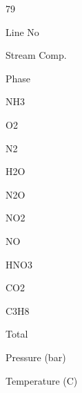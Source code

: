 \documentclass[a4paper,portrait,12pt]{article}
\begin{document}
79





\begin{flushleft}
\newpage
Line No
\end{flushleft}


\begin{flushleft}
Stream Comp.
\end{flushleft}


\begin{flushleft}
Phase
\end{flushleft}


\begin{flushleft}
NH3
\end{flushleft}


\begin{flushleft}
O2
\end{flushleft}


\begin{flushleft}
N2
\end{flushleft}


\begin{flushleft}
H2O
\end{flushleft}


\begin{flushleft}
N2O
\end{flushleft}


\begin{flushleft}
NO2
\end{flushleft}


\begin{flushleft}
NO
\end{flushleft}


\begin{flushleft}
HNO3
\end{flushleft}


\begin{flushleft}
CO2
\end{flushleft}


\begin{flushleft}
C3H8
\end{flushleft}


\begin{flushleft}
Total
\end{flushleft}


\begin{flushleft}
Pressure (bar)
\end{flushleft}


\begin{flushleft}
Temperature (C)
\end{flushleft}
\end{document}
